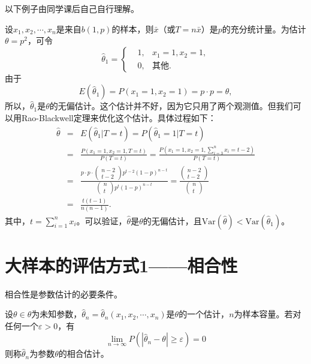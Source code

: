 以下例子由同学课后自己自行理解。
\begin{example}
设$x_1,x_2,\cdots,x_n$是来自$b(1,p)$的样本，则$\bar{x}$（或$T = n\bar{x}$）是$p$的充分统计量。为估计$\theta = p^2$，可令$$
\hat{\theta}_1 =\left\{
\begin{aligned}
& 1, & x_1 = 1, x_2 = 1,\\
& 0, & \text{其他}.
\end{aligned}
\right.
$$
由于
$$
E(\hat{\theta}_1) = P(x_1 = 1, x_2 = 1) = p\cdot p = \theta,
$$
所以，$\hat{\theta}_1 $是$\theta$的无偏估计。这个估计并不好，因为它只用了两个观测值。但我们可以用Rao-Blackwell定理来优化这个估计。具体过程如下：
\begin{eqnarray*}
    \hat{\theta} &=& E(\hat{\theta}_1 | T= t) = P(\hat{\theta}_1 = 1 | T = t) \\
    &=& \frac{P(x_1=1,x_2=1,T =t)}{P(T=t)} = \frac{P(x_1=1,x_2=1,\sum_{i=3}^nx_i =t-2)}{P(T=t)}\\
    &=& \frac{p \cdot p \cdot \begin{pmatrix}
        n-2\\t-2
    \end{pmatrix}p^{t-2} (1-p)^{n-t}}{\begin{pmatrix}
        n\\t
    \end{pmatrix}p^{t} (1-p)^{n-t}} = \frac{\begin{pmatrix}
        n-2\\t-2
    \end{pmatrix}}{\begin{pmatrix}
        n\\t
    \end{pmatrix}}\\
    &= & \frac{t(t-1)}{n(n-1)}.
\end{eqnarray*}
其中，$t=\sum_{i=1}^n x_i$。可以验证，$\hat{\theta}$是$\theta$的无偏估计，且$\text{Var}(\hat{\theta}) < \text{Var}(\hat{\theta}_1) $。
\end{example}

\section{大样本的评估方式1——相合性}

相合性是参数估计的必要条件。

\begin{definition}[相合估计]
设$\theta \in \theta $为未知参数，$\hat{\theta}_{n}=\hat{\theta}_{n}\left(x_{1}, x_{2}, \cdots, x_{n}\right)$是$\theta$的一个估计，$n$为样本容量。若对任何一个$\varepsilon>0$，有
$$\lim _{n \rightarrow \infty} P\left(\left|\hat{\theta}_{n}-\theta\right| \geqslant \varepsilon\right)=0 $$
则称$\hat{\theta}_{n}$为参数$\theta$的相合估计。
\end{definition}

